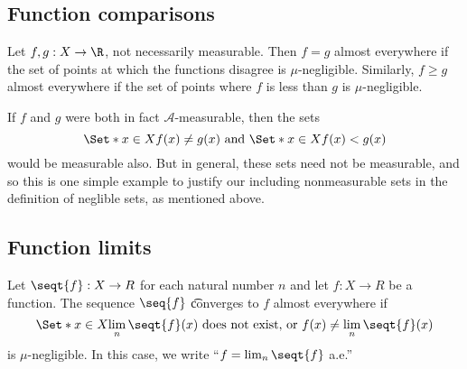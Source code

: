 \subsection*{Function comparisons}

Let $f, g: X \to \R $, not necessarily measurable.
Then $f = g$ almost everywhere if the set of points at which the functions disagree is
$\mu $-negligible.
Similarly, $f \geq g$ almost everywhere if the set of points where $f$ is less than $g$ is $\mu $-negligible.

If $f$ and $g$ were both in fact $\mathcal{A} $-measurable, then the sets
\[
\Set*{x \in X}{f(x) \neq g(x)}
\text{ and }
\Set*{x \in X}{f(x) < g(x)}
\]
would be measurable also.
But in general, these sets need not be measurable, and so this is one simple example to justify our including nonmeasurable sets in the definition of neglible sets, as mentioned above.

\subsection*{Function limits}

Let $\seqt{f}: X \to R$ for each natural number $n$ and let $f: X \to R$ be a function.
The sequence $\seq{f}$ \t{converges to $f$ almost everywhere} if
\[
\Set*{x \in X}{\lim_{n} \seqt{f}(x) \text{ does not exist, or } f(x) \neq \lim_{n} \seqt{f}(x)}
\]
is $\mu $-negligible.
In this case, we write ``$f = \lim_n \seqt{f}$ a.e.''
